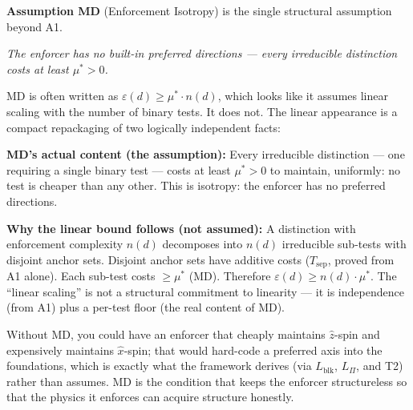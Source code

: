 \documentclass[11pt]{article}
\theoremstyle{remark}
\begin{document}
\medskip
\noindent\textbf{Assumption MD} (Enforcement Isotropy) is the single structural assumption beyond A1.

\smallskip\noindent\textit{The enforcer has no built-in preferred directions --- every irreducible distinction costs at least $\mu^* > 0$.}

\smallskip\noindent MD is often written as $\varepsilon(d) \ge \mu^* \cdot n(d)$, which looks like it assumes linear scaling with the number of binary tests.  It does not.  The linear appearance is a compact repackaging of two logically independent facts:

\smallskip\noindent\textbf{MD's actual content (the assumption):} Every irreducible distinction --- one requiring a single binary test --- costs at least $\mu^* > 0$ to maintain, uniformly: no test is cheaper than any other.  This is isotropy: the enforcer has no preferred directions.

\smallskip\noindent\textbf{Why the linear bound follows (not assumed):}  A distinction with enforcement complexity $n(d)$ decomposes into $n(d)$ irreducible sub-tests with disjoint anchor sets.  Disjoint anchor sets have additive costs ($T_{\mathrm{sep}}$, proved from A1 alone).  Each sub-test costs $\ge \mu^*$ (MD).  Therefore $\varepsilon(d) \ge n(d) \cdot \mu^*$.  The ``linear scaling'' is not a structural commitment to linearity --- it is independence (from A1) plus a per-test floor (the real content of MD).

\smallskip\noindent Without MD, you could have an enforcer that cheaply maintains $\hat{z}$-spin and expensively maintains $\hat{x}$-spin; that would hard-code a preferred axis into the foundations, which is exactly what the framework derives (via $L_{\mathrm{blk}}$, $L_\Pi$, and T2) rather than assumes.  MD is the condition that keeps the enforcer structureless so that the physics it enforces can acquire structure honestly.
\end{document}
